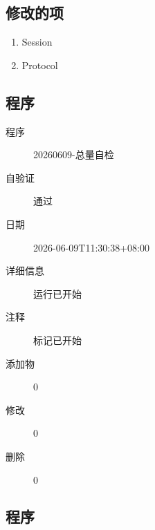 \documentclass[UTF8,10pt,a4paper,fontset=fandol]{ctexart}
\newcommand{\fieldvalue}[1]{#1}
\begin{document}
\subsection*{修改的项}

\begin{enumerate}
    \item \fieldvalue{Session}
    \item \fieldvalue{Protocol}
\end{enumerate}

\subsection*{程序}

\begin{description}
    \item[程序]%
    \fieldvalue{20260609-总量自检}

    \item[自验证]%
    \fieldvalue{通过}

    \item[日期]%
    \fieldvalue{2026-06-09T11:30:38+08:00}

    \item[详细信息]%
    \fieldvalue{运行已开始}

    \item[注释]%
    \fieldvalue{标记已开始}

    \item[添加物]%
    \fieldvalue{0}

    \item[修改]%
    \fieldvalue{0}

    \item[删除]%
    \fieldvalue{0}
\end{description}

\subsection*{程序}
\end{document}
